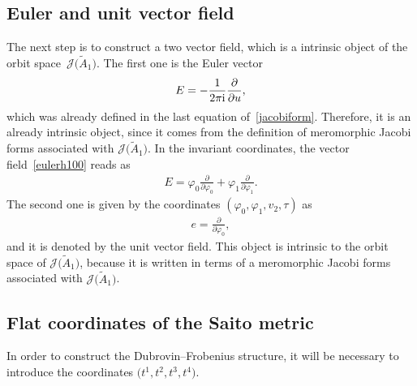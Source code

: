 \documentclass[pdftex]{sigma}%
\numberwithin{equation}{section}
\newcommand{\Ja}{\mathcal{J}}
\begin{document}
\subsection{Euler and unit vector field}

The next step is to construct a two vector field, which is a intrinsic object of the orbit spa\-ce~$\Ja\big(\tilde A_1\big)$. The first one is the Euler vector
\begin{gather}\label{eulerh100}
E=-\frac{1}{2\pi {\rm i}}\frac{\partial}{\partial u},
\end{gather}
which was already defined in the last equation of~\eqref{jacobiform}. Therefore, it is an already intrinsic object, since it comes from the definition of meromorphic Jacobi forms associated with $\Ja\big(\tilde A_1\big)$. In the invariant coordinates, the vector field~\eqref{eulerh100} reads as
\begin{gather*}
E=\varphi_0\frac{\partial}{\partial \varphi_0}+\varphi_1\frac{\partial}{\partial \varphi_1}.
\end{gather*}
The second one is given by the coordinates $(\varphi_0,\varphi_1,v_2,\tau)$ as
\begin{gather}\label{unith100}
e=\frac{\partial}{\partial \varphi_0},
\end{gather}
and it is denoted by the unit vector field. This object is intrinsic to the orbit space of $\Ja\big(\tilde A_1\big)$, because it is written in terms of a meromorphic Jacobi forms associated with $\Ja\big(\tilde A_1\big)$.

\subsection{Flat coordinates of the Saito metric}

In order to construct the Dubrovin--Frobenius structure, it will be necessary to introduce the coordinates $\big(t^1,t^2,t^3,t^4\big)$.
\end{document}
